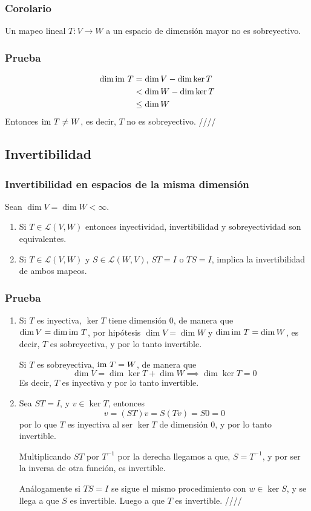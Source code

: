 \documentclass{article}
\begin{document}
\subsubsection{Corolario}
Un mapeo lineal $T: V\rightarrow W$ a un espacio de dimensión mayor
no es sobreyectivo.

\subsubsection*{Prueba}
\begin{align*}
    \dim\text{im } T &= \dim V - \dim\ker T\\
    &< \dim W - \dim\ker T \\
    &\leq \dim W
\end{align*}
Entonces $\text{im } T \neq W$, es decir, $T$ no es sobreyectivo.
\hfill ////

\subsection{Invertibilidad}
\subsubsection{Invertibilidad en espacios de la misma dimensión}
Sean $\dim V = \dim W < \infty$.
\begin{enumerate}
    \item Si $T\in\mathcal{L}(V,W)$ entonces
    inyectividad, invertibilidad y sobreyectividad son equivalentes.
    \item Si $T\in\mathcal{L}(V,W)$ y $S\in\mathcal{L}(W,V)$,
    $ST=I$ o $TS=I$, implica la invertibilidad de ambos mapeos.
\end{enumerate}

\subsubsection*{Prueba}
\begin{enumerate}
    \item Si $T$ es inyectiva, $\ker T$ tiene dimensión $0$, de manera 
    que\\
    $\dim V = \dim \text{im } T$, por hipótesis $\dim V = \dim W$ y
    $\dim \text{im } T = \dim W$, es decir, $T$ es sobreyectiva, y por lo tanto
    invertible.
    
    Si $T$ es sobreyectiva, $\text{im } T = W$, de manera que
    $$\dim V = \dim \ker T + \dim W \implies \dim \ker T = 0$$
    Es decir, $T$ es inyectiva y por lo tanto invertible.

    \item Sea $ST=I$, y $v\in\ker T$, entonces
    $$v = (ST)v = S(Tv) = S0 = 0$$
    por lo que $T$ es inyectiva al ser $\ker T$ de dimensión $0$,
    y por lo tanto invertible.

    Multiplicando $ST$ por $T^{-1}$ por la derecha llegamos a que,
    $S=T^{-1}$, y por ser la inversa de otra función, es invertible. 

    Análogamente si $TS=I$ se sigue el mismo procedimiento con
    $w\in\ker S$, y se llega a que $S$ es invertible. Luego a que $T$ 
    es invertible. \hfill ////
\end{enumerate}
\end{document}
